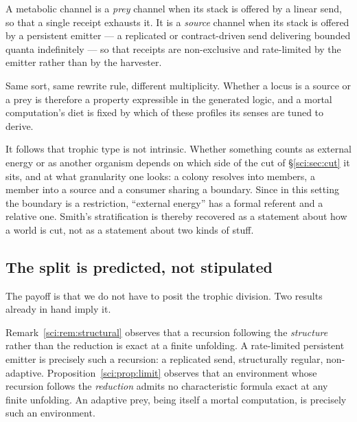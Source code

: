 \begin{definition}
\label{sci:def:source}
A metabolic channel is a \emph{prey} channel when its stack is offered by a linear send, so that a
single receipt exhausts it. It is a \emph{source} channel when its stack is offered by a persistent
emitter --- a replicated or contract-driven send delivering bounded quanta indefinitely --- so that
receipts are non-exclusive and rate-limited by the emitter rather than by the harvester.
\end{definition}

Same sort, same rewrite rule, different multiplicity. Whether a locus is a source or a prey is
therefore a property expressible in the generated logic, and a mortal computation's diet is fixed by
which of these profiles its senses are tuned to derive.

\begin{remark}
\label{sci:rem:cut}
It follows that trophic type is not intrinsic. Whether something counts as external energy or as
another organism depends on which side of the cut of \S\ref{sci:sec:cut} it sits, and at what granularity
one looks: a colony resolves into members, a member into a source and a consumer sharing a boundary.
Since in this setting the boundary is a restriction, ``external energy'' has a formal referent and a
relative one. Smith's stratification is thereby recovered as a statement about how a world is cut, not
as a statement about two kinds of stuff.
\end{remark}

\subsection{The split is predicted, not stipulated}\label{sci:S11.3}

The payoff is that we do not have to posit the trophic division. Two results already in hand imply it.

Remark~\ref{sci:rem:structural} observes that a recursion following the \emph{structure} rather than the
reduction is exact at a finite unfolding. A rate-limited persistent emitter is precisely such a
recursion: a replicated send, structurally regular, non-adaptive. Proposition~\ref{sci:prop:limit}
observes that an environment whose recursion follows the \emph{reduction} admits no characteristic
formula exact at any finite unfolding. An adaptive prey, being itself a mortal computation, is
precisely such an environment.

